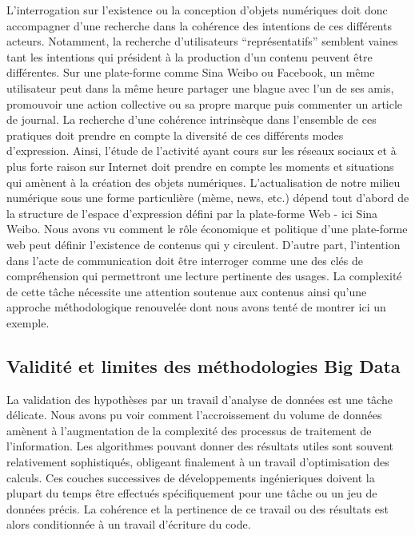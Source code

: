 L'interrogation sur l'existence ou la conception d'objets numériques doit donc accompagner d'une recherche dans la cohérence des intentions de ces différents acteurs. Notamment, la recherche d'utilisateurs ``représentatifs'' semblent vaines tant les intentions qui président à la production d'un contenu peuvent être différentes. Sur une plate-forme comme Sina Weibo ou Facebook, un même utilisateur peut dans la même heure partager une blague avec l'un de ses amis, promouvoir une action collective ou sa propre marque puis commenter un article de journal. La recherche d'une cohérence intrinsèque dans l'ensemble de ces pratiques doit prendre en compte la diversité de ces différents modes d'expression. Ainsi, l'étude de l'activité ayant cours sur les réseaux sociaux et à plus forte raison sur Internet doit prendre en compte les moments et situations qui amènent à la création des objets numériques. L'actualisation de notre milieu numérique sous une forme particulière (mème, news, etc.) dépend tout d'abord de la structure de l'espace d'expression défini par la plate-forme Web - ici Sina Weibo. Nous avons vu comment le rôle économique et politique d'une plate-forme web peut définir l'existence de contenus qui y circulent. D'autre part, l'intention dans l'acte de communication doit être interroger comme une des clés de compréhension qui permettront une lecture pertinente des usages. La complexité de cette tâche nécessite une attention soutenue aux contenus ainsi qu'une approche méthodologique renouvelée dont nous avons tenté de montrer ici un exemple.


\subsection[Validité et limites des méthodologies Big Data]{Validité et limites des méthodologies Big Data}


La validation des hypothèses par un travail d'analyse de données est une tâche délicate. Nous avons pu voir comment l'accroissement du volume de données amènent à l'augmentation de la complexité des processus de traitement de l'information. Les algorithmes pouvant donner des résultats utiles sont souvent relativement sophistiqués, obligeant finalement à un travail d'optimisation des calculs. Ces couches successives de développements ingénieriques doivent la plupart du temps être effectués spécifiquement pour une tâche ou un jeu de données précis. La cohérence et la pertinence de ce travail ou des résultats est alors conditionnée à un travail d'écriture du code. 

